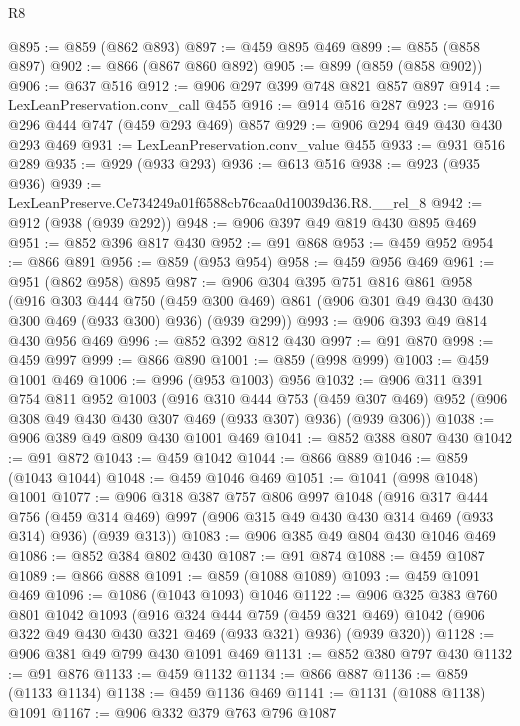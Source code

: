 \begin{lexlean}{R8}
\begin{coremodule}
@895 := @859 (@862 @893)
@897 := @459 @895 @469
@899 := @855 (@858 @897)
@902 := @866 (@867 @860 @892)
@905 := @899 (@859 (@858 @902))
@906 := @637 @516
@912 := @906 @297 @399 @748 @821 @857 @897
@914 := LexLeanPreservation.conv_call @455
@916 := @914 @516 @287
@923 := @916 @296 @444 @747 (@459 @293 @469) @857
@929 := @906 @294 @49 @430 @430 @293 @469
@931 := LexLeanPreservation.conv_value @455
@933 := @931 @516 @289
@935 := @929 (@933 @293)
@936 := @613 @516
@938 := @923 (@935 @936)
@939 := LexLeanPreserve.Ce734249a01f6588cb76caa0d10039d36.R8.__rel_8
@942 := @912 (@938 (@939 @292))
@948 := @906 @397 @49 @819 @430 @895 @469
@951 := @852 @396 @817 @430
@952 := @91 @868
@953 := @459 @952
@954 := @866 @891
@956 := @859 (@953 @954)
@958 := @459 @956 @469
@961 := @951 (@862 @958) @895
@987 := @906
    @304
    @395
    @751
    @816
    @861
    @958
    (@916
      @303
      @444
      @750
      (@459 @300 @469)
      @861
      (@906 @301 @49 @430 @430 @300 @469 (@933 @300) @936)
      (@939 @299))
@993 := @906 @393 @49 @814 @430 @956 @469
@996 := @852 @392 @812 @430
@997 := @91 @870
@998 := @459 @997
@999 := @866 @890
@1001 := @859 (@998 @999)
@1003 := @459 @1001 @469
@1006 := @996 (@953 @1003) @956
@1032 := @906
    @311
    @391
    @754
    @811
    @952
    @1003
    (@916
      @310
      @444
      @753
      (@459 @307 @469)
      @952
      (@906 @308 @49 @430 @430 @307 @469 (@933 @307) @936)
      (@939 @306))
@1038 := @906 @389 @49 @809 @430 @1001 @469
@1041 := @852 @388 @807 @430
@1042 := @91 @872
@1043 := @459 @1042
@1044 := @866 @889
@1046 := @859 (@1043 @1044)
@1048 := @459 @1046 @469
@1051 := @1041 (@998 @1048) @1001
@1077 := @906
    @318
    @387
    @757
    @806
    @997
    @1048
    (@916
      @317
      @444
      @756
      (@459 @314 @469)
      @997
      (@906 @315 @49 @430 @430 @314 @469 (@933 @314) @936)
      (@939 @313))
@1083 := @906 @385 @49 @804 @430 @1046 @469
@1086 := @852 @384 @802 @430
@1087 := @91 @874
@1088 := @459 @1087
@1089 := @866 @888
@1091 := @859 (@1088 @1089)
@1093 := @459 @1091 @469
@1096 := @1086 (@1043 @1093) @1046
@1122 := @906
    @325
    @383
    @760
    @801
    @1042
    @1093
    (@916
      @324
      @444
      @759
      (@459 @321 @469)
      @1042
      (@906 @322 @49 @430 @430 @321 @469 (@933 @321) @936)
      (@939 @320))
@1128 := @906 @381 @49 @799 @430 @1091 @469
@1131 := @852 @380 @797 @430
@1132 := @91 @876
@1133 := @459 @1132
@1134 := @866 @887
@1136 := @859 (@1133 @1134)
@1138 := @459 @1136 @469
@1141 := @1131 (@1088 @1138) @1091
@1167 := @906
    @332
    @379
    @763
    @796
    @1087

\end{coremodule}
\end{lexlean}
